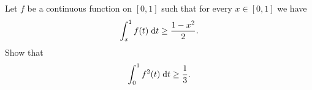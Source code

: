 \documentclass{article}
\begin{document}
	\setlength{\parindent}{0pt}
	Let $f$ be a continuous function on $[0, 1]$ such that for every $x\in[0, 1]$ we have
	$$\int_{x}^{1}f(t)\;\textup{d}t\geq\frac{1-x^2}{2}.$$
	Show that
	$$\int_{0}^{1}f^2(t)\;\textup{d}t\geq\frac{1}{3}.$$
\end{document}
